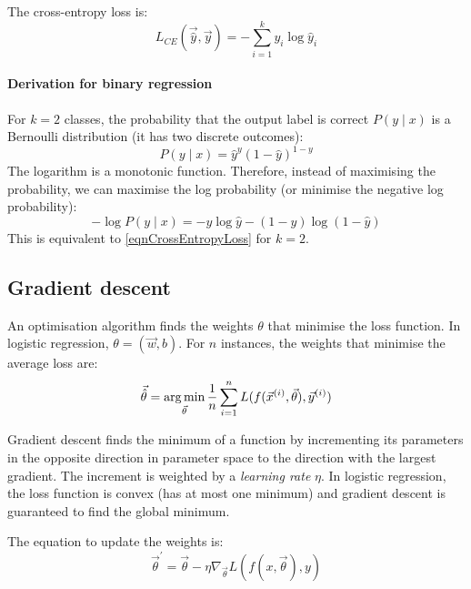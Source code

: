 The cross-entropy loss is:
\begin{equation}
  \label{eqnCrossEntropyLoss}
  L_{CE}(\vec{\hat{y}}, \vec{y}) = - \sum_{i = 1}^{k} y_i \log \hat{y}_i
\end{equation}

\paragraph{Derivation for binary regression}

For $k = 2$ classes, the probability that the output label is correct $P(y \mid x)$ is a Bernoulli distribution (it has two discrete outcomes):
\begin{equation}
  \label{eqnDerivation1}
  P(y \mid x) = \hat{y}^y (1 - \hat{y})^{1 - y}
\end{equation}
The logarithm is a monotonic function.
Therefore, instead of maximising the probability, we can maximise the log probability (or minimise the negative log probability):
\begin{equation}
  \label{eqnDerivation2}
  - \log P(y \mid x) = - y \log \hat{y} - (1 - y) \log (1 - \hat{y})
\end{equation}
This is equivalent to \ref{eqnCrossEntropyLoss} for $k = 2$.

\subsection{Gradient descent}

An optimisation algorithm finds the weights $\theta$ that minimise the loss function.
In logistic regression, $\theta = (\vec{w}, b)$.
For $n$ instances, the weights that minimise the average loss are:
\begin{equation}
  \label{eqnWeightsOptimal}
  \vec{\hat{\theta}} = \operatorname*{arg\,min}_{\vec{\theta}} \frac{1}{n} \sum_{i = 1}^{n} L(f(\vec{x}^{(i)}, \vec{\theta}), \vec{y}^{(i)})
\end{equation}

Gradient descent finds the minimum of a function by incrementing its parameters in the opposite direction in parameter space to the direction with the largest gradient.
The increment is weighted by a \textit{learning rate} $\eta$.
In logistic regression, the loss function is convex (has at most one minimum) and gradient descent is guaranteed to find the global minimum.

The equation to update the weights is:
\begin{equation}
  \label{eqnWeightsUpdate}
  \vec{\theta}^\prime = \vec{\theta} - \eta \nabla_{\vec{\theta}} L(f(x, \vec{\theta}), y)
\end{equation}

